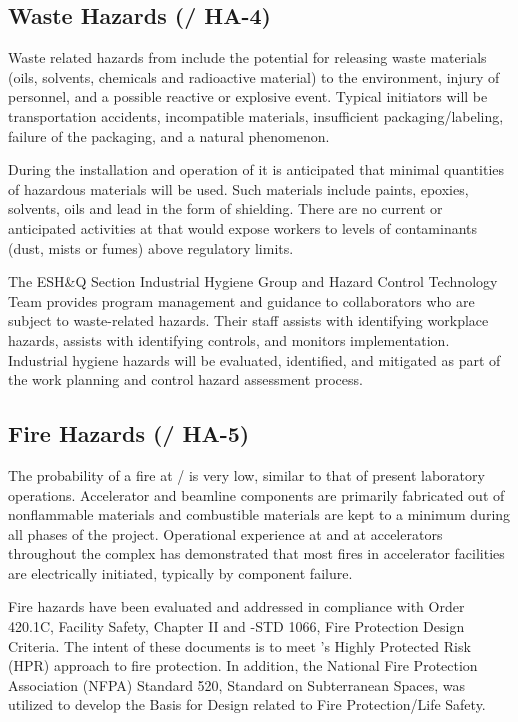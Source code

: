 \subsection{Waste Hazards (/ HA-4)}

Waste related hazards from  include the potential for releasing
waste materials (oils, solvents, chemicals and radioactive material)
to the environment, injury of personnel, and a possible reactive or
explosive event. Typical initiators will be transportation accidents,
incompatible materials, insufficient packaging/labeling, failure of
the packaging, and a natural phenomenon.

During the installation and operation of  it is anticipated that
minimal quantities of hazardous materials will be used. Such materials
include paints, epoxies, solvents, oils and lead in the form of
shielding. There are no current or anticipated activities at  that
would expose workers to levels of contaminants (dust, mists or fumes)
above regulatory limits.

The ESH\&Q Section Industrial Hygiene Group and Hazard Control
Technology Team provides program management and guidance to
collaborators who are subject to
waste-related hazards.  Their staff assists with identifying workplace
hazards, assists with identifying controls, and monitors
implementation. Industrial hygiene hazards will be evaluated,
identified, and mitigated as part of the work planning and control
hazard assessment process.

\subsection{Fire Hazards (/ HA-5)}

 The probability of a fire at
/ is very low, similar to that of present
laboratory operations. Accelerator and beamline components are
primarily fabricated out of nonflammable materials and combustible
materials are kept to a minimum during all phases of the
project. Operational experience at \fnal and at accelerators
throughout the  complex has demonstrated that most fires in
accelerator facilities are electrically initiated, typically by
component failure.

Fire hazards have been evaluated and addressed in compliance with 
Order 420.1C, Facility Safety, Chapter II and -STD 1066, Fire
Protection Design Criteria.  The intent of these documents is to meet
's Highly Protected Risk (HPR) approach to fire protection.  In
addition, the National Fire Protection Association (NFPA) Standard
520, Standard on Subterranean Spaces, was utilized to develop the
Basis for Design related to Fire Protection/Life Safety.

